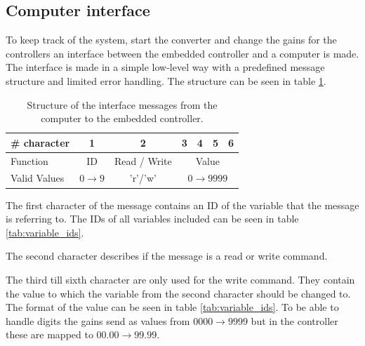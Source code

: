 \subsection{Computer interface}

To keep track of the system, start the converter and change the gains for the controllers an interface between the embedded controller and a computer is made. The interface is made in a simple low-level way with a predefined message structure and limited error handling. The structure can be seen in table \ref{tab:message_structure}. 


\begin{table}[H]
\centering
\begin{tabular}{|l|c|c|c|c|c|c|}
\hline
\# character       & 1       & 2                 & 3            & 4            & 5       & 6   \\ \hline
Function      & ID  & Read / Write                     & \multicolumn{4}{c|}{Value}               \\ \hline
Valid Values & $0\rightarrow 9$ & 'r'/'w'  & \multicolumn{4}{c|}{$0\rightarrow 9999$} \\ \hline
\end{tabular}
\caption{Structure of the interface messages from the computer to the embedded controller.}
\label{tab:message_structure}
\end{table}

The first character of the message contains an ID of the variable that the message is referring to. The IDs of all variables included can be seen in table \ref{tab:variable_ids}.

The second character describes if the message is a read or write command.

The third till sixth character are only used for the write command. They contain the value to which the variable from the second character should be changed to. The format of the value can be seen in table \ref{tab:variable_ids}. To be able to handle digits the gains send as values from $0000 \rightarrow 9999$ but in the controller these are mapped to $00.00 \rightarrow 99.99$.


